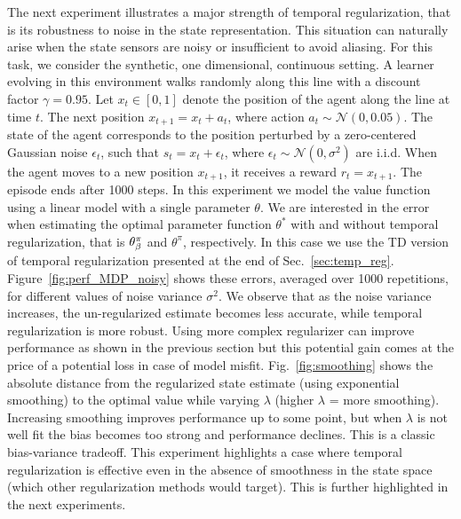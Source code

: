 The next experiment illustrates a major strength of temporal regularization, that is its robustness to noise in the state representation. This situation can naturally arise when the state sensors are noisy or insufficient to avoid aliasing. For this task, we consider the synthetic, one dimensional, continuous setting. A learner evolving in this environment walks randomly along this line with a discount factor $\gamma=0.95$. Let $x_t\in [0,1]$ denote the position of the agent along the line at time $t$. The next position $x_{t+1} = x_t + a_t$, where action $a_t\sim\mathcal{N}(0, 0.05)$. The state of the agent corresponds to the position perturbed by a zero-centered Gaussian noise $\epsilon_t$, such that $s_t = x_t + \epsilon_t$, where $\epsilon_t\sim\mathcal{N}(0,\sigma^2)$ are i.i.d. When the agent moves to a new position $x_{t+1}$, it receives a reward $r_t = x_{t+1}$. The episode ends after 1000 steps. In this experiment we model the value function using a linear model with a single parameter $\theta$. We are interested in the error when estimating the optimal parameter function $\theta^*$ with and without temporal regularization, that is $\theta^\pi_\beta$ and $\theta^\pi$, respectively. In this case we use the TD version of temporal regularization presented at the end of Sec.~\ref{sec:temp_reg}.
Figure~\ref{fig:perf_MDP_noisy} shows these errors, averaged over 1000 repetitions, for different values of noise variance $\sigma^2$. We observe that as the noise variance increases, the un-regularized estimate becomes less accurate, while temporal regularization is more robust. Using more complex regularizer can improve performance as shown in the previous section but this potential gain comes at the price of a potential loss in case of model misfit. Fig.~\ref{fig:smoothing} shows the absolute distance from the regularized state estimate (using exponential smoothing) to the optimal value while varying $\lambda$ (higher $\lambda$ = more smoothing). Increasing smoothing improves performance up to some point, but when $\lambda$ is not well fit the bias becomes too strong and performance declines. This is a classic bias-variance tradeoff. This experiment highlights a case where temporal regularization is effective even in the absence of smoothness in the state space (which other regularization methods would target). This is further highlighted in the next experiments.

